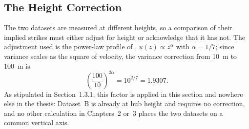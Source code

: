 \documentclass[11pt, a4paper, twoside]{article}
\begin{document}
\subsection{The Height Correction}
\label{sec:height}

The two datasets are measured at different heights, so a comparison of their implied strikes must either adjust for height or acknowledge that it has not. The adjustment used is the power-law profile of \citet{PetersonHennessey1978}, $u(z) \propto z^{\alpha}$ with $\alpha = 1/7$; since variance scales as the square of velocity, the variance correction from 10~m to 100~m is
\begin{equation}
\left(\frac{100}{10}\right)^{2\alpha} = 10^{2/7} = 1.9307.
\label{eq:height}
\end{equation}
As stipulated in Section~1.3.1, this factor is applied in this section and nowhere else in the thesis: Dataset~B is already at hub height and requires no correction, and no other calculation in Chapters~2 or~3 places the two datasets on a common vertical axis.
\end{document}
